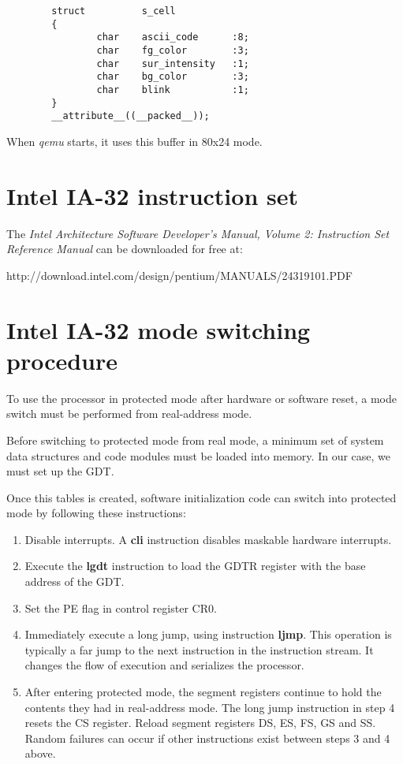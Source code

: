 \begin{verbatim}
        struct          s_cell
        {
                char    ascii_code      :8;
                char    fg_color        :3;
                char    sur_intensity   :1;
                char    bg_color        :3;
                char    blink           :1;
        }
        __attribute__((__packed__));
\end{verbatim}

When \emph{qemu} starts, it uses this buffer in 80x24 mode.

%
%

\newpage
\section{Intel IA-32 instruction set}

The  \emph{Intel Architecture Software Developer's Manual, Volume 2:
Instruction Set Reference Manual} can be downloaded for free at:

http://download.intel.com/design/pentium/MANUALS/24319101.PDF

\section{Intel IA-32 mode switching procedure}

To use the processor in protected mode after hardware or software reset, a mode
switch must be performed from real-address mode.

Before switching to protected mode from real mode, a minimum set of system data
structures and code modules must be loaded into memory. In our case, we must
set up the GDT.

Once this tables is created, software initialization code can switch into
protected mode by following these instructions:
\begin{enumerate}
  \item
    Disable interrupts. A \textbf{cli} instruction disables maskable
    hardware interrupts.
  \item
    Execute the \textbf{lgdt} instruction to load the GDTR register
    with the base address of the GDT.
  \item
    Set the PE flag in control register CR0.
  \item
    Immediately execute a long jump, using instruction \textbf{ljmp}.
    This operation is typically a far jump to the next instruction in the
    instruction stream. It changes the flow of execution and serializes the
    processor.
  \item
    After entering protected mode, the segment registers continue to
    hold the contents they had in real-address mode. The long jump instruction
    in step 4 resets the CS register. Reload segment registers DS, ES, FS, GS
    and SS. Random failures can occur if other instructions exist between
    steps 3 and 4 above.
\end{enumerate}

